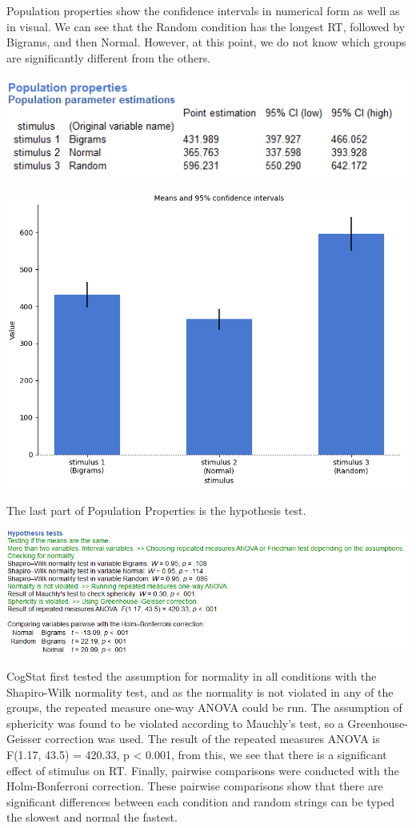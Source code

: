 \documentclass[
]{book}
\begin{document}
Population properties show the confidence intervals in numerical form as well as in visual. We can see that the Random condition has the longest RT, followed by Bigrams, and then Normal. However, at this point, we do not know which groups are significantly different from the others.

\includegraphics{img/ch9/9.4CRMVAG_popprop.png}

\includegraphics{img/ch9/9.4CRMVAG_CI.png}

The last part of Population Properties is the hypothesis test.

\includegraphics{img/ch9/9.4CRMVAG_hyptest.png}

CogStat first tested the assumption for normality in all conditions with the Shapiro-Wilk normality test, and as the normality is not violated in any of the groups, the repeated measure one-way ANOVA could be run. The assumption of sphericity was found to be violated according to Mauchly's test, so a Greenhouse-Geisser correction was used. The result of the repeated measures ANOVA is F(1.17, 43.5) = 420.33, p \textless{} 0.001, from this, we see that there is a significant effect of stimulus on RT. Finally, pairwise comparisons were conducted with the Holm-Bonferroni correction. These pairwise comparisons show that there are significant differences between each condition and random strings can be typed the slowest and normal the fastest.
\end{document}
